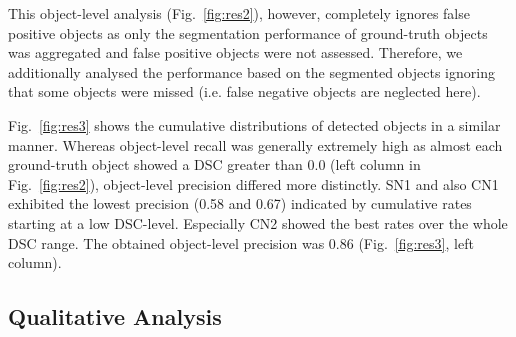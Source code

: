 \documentclass{elsarticle}
\begin{document}
This object-level analysis (Fig.~\ref{fig:res2}), however, completely ignores false positive objects as only the segmentation performance of ground-truth objects was aggregated and false positive objects were not assessed.
Therefore, we additionally analysed the performance based on the segmented objects ignoring that some objects were missed (i.e. false negative objects are neglected here). 

Fig.~\ref{fig:res3} shows the cumulative distributions of detected objects in a similar manner.
Whereas object-level recall was generally extremely high as almost each ground-truth object showed a DSC greater than 0.0 (left column in Fig.~\ref{fig:res2}), object-level precision differed more distinctly. 
SN1 and also CN1 exhibited the lowest precision (0.58 and 0.67) indicated by cumulative rates starting at a low DSC-level.
Especially CN2 showed the best rates over the whole DSC range. The obtained object-level precision was 0.86 (Fig.~\ref{fig:res3}, left column).


\subsection{Qualitative Analysis} \label{sec:resObj}
\end{document}
